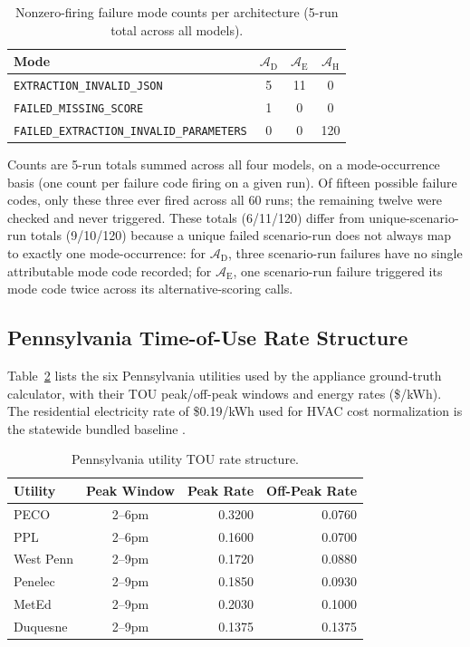 \documentclass[11pt]{article}
\begin{document}
\begin{table}[htbp]
\small\centering
\caption{Nonzero-firing failure mode counts per architecture (5-run total across all models).}
\label{tab:failure_modes}
\begin{tabular}{lccc}
\toprule
Mode & $\mathcal{A}_{\text{D}}$ & $\mathcal{A}_{\text{E}}$ & $\mathcal{A}_{\text{H}}$ \\
\midrule
\texttt{EXTRACTION\_INVALID\_JSON} & 5 & 11 & 0 \\
\texttt{FAILED\_MISSING\_SCORE} & 1 & 0 & 0 \\
\texttt{FAILED\_EXTRACTION\_INVALID\_PARAMETERS} & 0 & 0 & 120 \\
\bottomrule
\end{tabular}
\end{table}


Counts are 5-run totals summed across all four models, on a mode-occurrence basis (one count per failure code firing on a given run). Of fifteen possible failure codes, only these three ever fired across all 60 runs; the remaining twelve were checked and never triggered. These totals (6/11/120) differ from unique-scenario-run totals (9/10/120) because a unique failed scenario-run does not always map to exactly one mode-occurrence: for $\mathcal{A}_{\text{D}}$, three scenario-run failures have no single attributable mode code recorded; for $\mathcal{A}_{\text{E}}$, one scenario-run failure triggered its mode code twice across its alternative-scoring calls.

\subsection{Pennsylvania Time-of-Use Rate Structure}
\label{app:tou_rates}

Table~\ref{tab:tou_rates} lists the six Pennsylvania utilities used by
the appliance ground-truth calculator, with their TOU peak/off-peak
windows and energy rates (\$/kWh). The residential electricity rate of \$0.19/kWh used for HVAC cost normalization is the
statewide bundled baseline \citep{eia_epa_2024,paupc2025}.

\begin{table}[htbp]
\small
\centering
\renewcommand{\arraystretch}{1.15}
\caption{Pennsylvania utility TOU rate structure.}
\label{tab:tou_rates}
\begin{tabular}{@{}l c rr@{}}
\toprule
\textbf{Utility} & \textbf{Peak Window} & \textbf{Peak Rate} &
  \textbf{Off-Peak Rate} \\
\midrule
PECO       & 2--6pm  & 0.3200 & 0.0760 \\
PPL        & 2--6pm  & 0.1600 & 0.0700 \\
West Penn  & 2--9pm  & 0.1720 & 0.0880 \\
Penelec    & 2--9pm  & 0.1850 & 0.0930 \\
MetEd      & 2--9pm  & 0.2030 & 0.1000 \\
Duquesne   & 2--9pm  & 0.1375 & 0.1375 \\
\bottomrule
\end{tabular}
\renewcommand{\arraystretch}{1.0}
\end{table}
\end{document}
